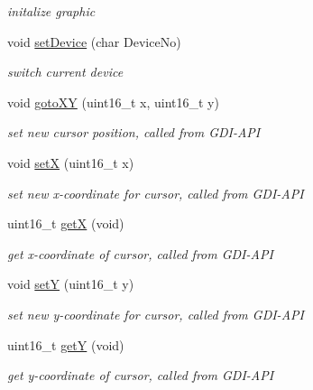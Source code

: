 \begin{CompactItemize}
\begin{CompactList}\small\item\em initalize graphic \item\end{CompactList}\item 
void \hyperlink{group__graphic__device_gb1d5625d6d64546097d27be58b43a5f9}{setDevice} (char DeviceNo)
\begin{CompactList}\small\item\em switch current device \item\end{CompactList}\item 
void \hyperlink{group__graphic__device_g7551aae0561930d02c9981917c4d9d9b}{gotoXY} (uint16\_\-t x, uint16\_\-t y)
\begin{CompactList}\small\item\em set new cursor position, called from GDI-API \item\end{CompactList}\item 
void \hyperlink{group__graphic__device_gba6affc39995efe14043eadbf0b43827}{setX} (uint16\_\-t x)
\begin{CompactList}\small\item\em set new x-coordinate for cursor, called from GDI-API \item\end{CompactList}\item 
uint16\_\-t \hyperlink{group__graphic__device_g4bcab06388adcd058a24e1cac1e2e544}{getX} (void)
\begin{CompactList}\small\item\em get x-coordinate of cursor, called from GDI-API \item\end{CompactList}\item 
void \hyperlink{group__graphic__device_gebdf36b1cfeae90226306544e8b0f546}{setY} (uint16\_\-t y)
\begin{CompactList}\small\item\em set new y-coordinate for cursor, called from GDI-API \item\end{CompactList}\item 
uint16\_\-t \hyperlink{group__graphic__device_g32fe0e72f29aeb9a8285f00cfbe59957}{getY} (void)
\begin{CompactList}\small\item\em get y-coordinate of cursor, called from GDI-API \item\end{CompactList}\item 

\end{CompactItemize}
